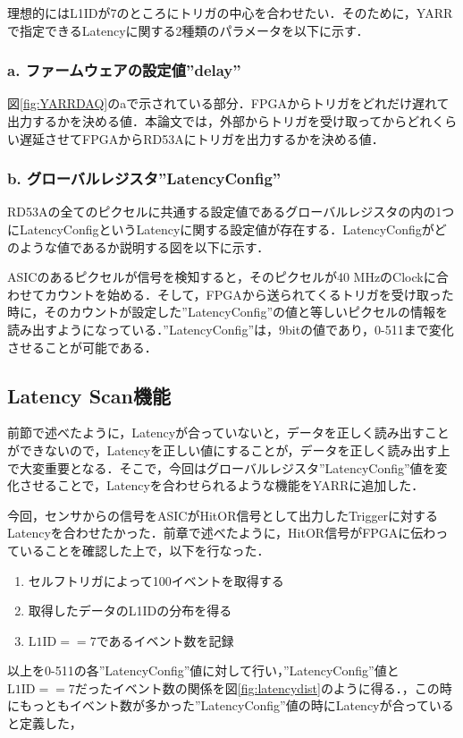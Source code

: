 理想的にはL1IDが7のところにトリガの中心を合わせたい．そのために，YARRで指定できるLatencyに関する2種類のパラメータを以下に示す．

%

\subsubsection*{a. ファームウェアの設定値''delay''}
図\ref{fig:YARRDAQ}のaで示されている部分．FPGAからトリガをどれだけ遅れて出力するかを決める値．本論文では，外部からトリガを受け取ってからどれくらい遅延させてFPGAからRD53Aにトリガを出力するかを決める値．

\subsubsection*{b. グローバルレジスタ''LatencyConfig''}
RD53Aの全てのピクセルに共通する設定値であるグローバルレジスタの内の1つにLatencyConfigというLatencyに関する設定値が存在する．LatencyConfigがどのような値であるか説明する図を以下に示す．\par
ASICのあるピクセルが信号を検知すると，そのピクセルが40 $\mathrm{MHz}$のClockに合わせてカウントを始める．そして，FPGAから送られてくるトリガを受け取った時に，そのカウントが設定した''LatencyConfig''の値と等しいピクセルの情報を読み出すようになっている．''LatencyConfig''は，9bitの値であり，0-511まで変化させることが可能である．

\subsection{Latency Scan機能}
前節で述べたように，Latencyが合っていないと，データを正しく読み出すことができないので，Latencyを正しい値にすることが，データを正しく読み出す上で大変重要となる．そこで，今回はグローバルレジスタ''LatencyConfig''値を変化させることで，Latencyを合わせられるような機能をYARRに追加した．\par
今回，センサからの信号をASICがHitOR信号として出力したTriggerに対するLatencyを合わせたかった．前章で述べたように，HitOR信号がFPGAに伝わっていることを確認した上で，以下を行なった．
\begin{enumerate}
\item セルフトリガによって100イベントを取得する
\item 取得したデータのL1IDの分布を得る
\item $\mathrm{L1ID} == 7$であるイベント数を記録
\end{enumerate}
以上を0-511の各''LatencyConfig''値に対して行い，''LatencyConfig''値と$\mathrm{L1ID} == 7$だったイベント数の関係を図\ref{fig:latencydist}のように得る．，この時にもっともイベント数が多かった''LatencyConfig''値の時にLatencyが合っていると定義した，


